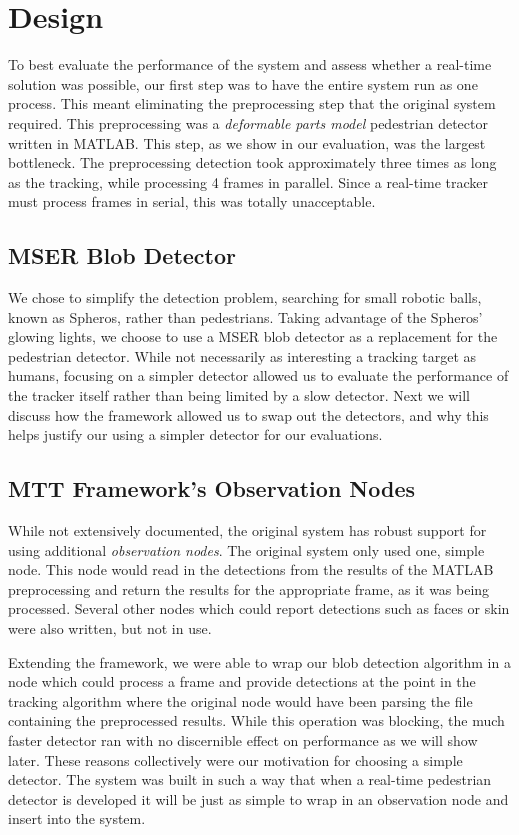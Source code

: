 \section{Design}
\label{sec:design}

To best evaluate the performance of the system and assess whether a real-time solution was possible, our first step was to have
the entire system run as one process. This meant eliminating the preprocessing step that the original system required. This
preprocessing was a \emph{deformable parts model} pedestrian detector written in MATLAB. This step, as we show in our
evaluation, was the largest bottleneck. The preprocessing detection took approximately three times as long as the tracking, while
processing 4 frames in parallel. Since a real-time tracker must process frames in serial, this was totally unacceptable.

\subsection{MSER Blob Detector}
We chose to simplify the detection problem, searching for small robotic balls, known as Spheros, rather than pedestrians. Taking advantage of the Spheros' glowing lights, we choose to use a MSER blob detector as a replacement for the pedestrian detector.
While not necessarily as interesting a tracking target as humans, focusing on a simpler detector allowed us to evaluate the
performance of the tracker itself rather than being limited by a slow detector. Next we will discuss how the framework allowed 
us to swap out the detectors, and why this helps justify our using a simpler detector for our evaluations.

\subsection{MTT Framework's Observation Nodes}
While not extensively documented, the original system has robust support for using additional \emph{observation nodes}. The
original system only used one, simple node. This node would read in the detections from the results of the MATLAB
preprocessing and return the results for the appropriate frame, as it was being processed. Several other nodes which could
report detections such as faces or skin were also written, but not in use.

Extending the framework, we were able to wrap our blob detection algorithm in a node which could process a frame and provide
detections at the point in the tracking algorithm where the original node would have been parsing the file containing the
preprocessed results. While this operation was blocking, the much faster detector ran with no discernible effect on performance
as we will show later. These reasons collectively were our motivation for choosing a simple detector. The system was built in
such a way that when a real-time pedestrian detector is developed it will be just as simple to wrap in an observation node and
insert into the system.